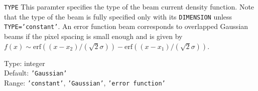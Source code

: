 \begin{keydescription}{\texttt{TYPE}}
This paramter specifies the type of the beam current density function. Note that
the type of the beam is fully specified only with its \texttt{DIMENSION} unless
\texttt{TYPE='constant'}. An error function beam corresponds to overlapped
Gaussian beams if the pixel spacing is small enough and is given by $f(x) \sim
\mathrm{erf}((x-x_2)/(\sqrt{2}\sigma)) -
\mathrm{erf}((x-x_1)/(\sqrt{2}\sigma))$.
\begin{keytab}
   Type:    \> integer \\
   Default: \> \texttt{'Gaussian'} \\
   Range:   \> \texttt{'constant'}, \texttt{'Gaussian'}, 
               \texttt{'error function'}
\end{keytab}
\end{keydescription}
